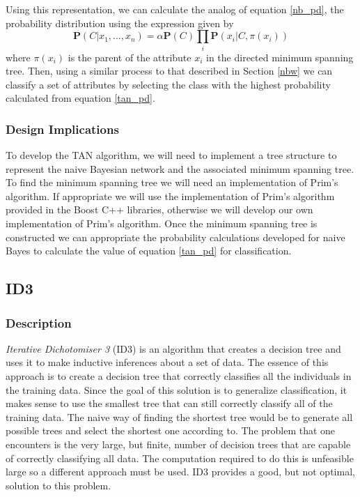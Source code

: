 \documentclass{article}
\newcommand{\ve}[1]{\boldsymbol{\mathbf{#1}}}
\begin{document}
				Using this representation, we can calculate the analog of equation \ref{nb_pd}, the probability distribution using the expression given by \cite{Zheng2010}
				\begin{equation}
						\ve{P}(C|x_1,...,x_n) = \alpha \ve{P}(C) \prod_i \ve{P}(x_i| C, \pi(x_i)) \label{tan_pd}
				\end{equation}
				where $\pi(x_i)$ is the parent of the attribute $x_i$ in the directed minimum spanning tree. 
				Then, using a similar process to that described in Section \ref{nbw} we can classify a set of attributes by selecting the class with the highest probability calculated from equation \ref{tan_pd}.
			\subsubsection{Design Implications}
				To develop the TAN algorithm, we will need to implement a tree structure to represent the naive Bayesian network and the associated minimum spanning tree. 
				To find the minimum spanning tree we will need an implementation of Prim's algorithm.
				If appropriate we will use the implementation of Prim's algorithm provided in the Boost C++ libraries, otherwise we will develop our own implementation of Prim's algorithm. 
				Once the minimum spanning tree is constructed we can appropriate the probability calculations developed for naive Bayes to calculate the value of equation \ref{tan_pd} for classification.
		\subsection{ID3}
			\subsubsection{Description}
				\textit{Iterative Dichotomiser 3} (ID3) is an algorithm that creates a decision tree and uses it to make inductive inferences about a set of data.
			    The essence of this approach is to create a decision tree that correctly classifies all the individuals in the training data.
				Since the goal of this solution is to generalize classification, it makes sense to use the smallest tree that can still correctly classify all of the training data.
				The naive way of finding the shortest tree would be to generate all possible trees and select the shortest one according to\cite{Quinlan1986}.
				The problem that one encounters is the very large, but finite, number of decision trees that are capable of correctly classifying all data.
				The computation required to do this is unfeasible large so a different approach must be used.
				ID3 provides a good, but not optimal, solution to this problem.
		
\end{document}
